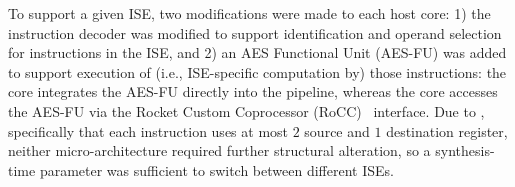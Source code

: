 \noindent
To support a given ISE, two modifications were made to each host core:
1) the instruction decoder was modified to support identification and 
   operand selection for instructions in the ISE,
   and
2) an AES Functional Unit (AES-FU) was added to support execution of
   (i.e., ISE-specific computation by) those instructions:
   the  core integrates the AES-FU directly into the pipeline,
   whereas
   the  core accesses   the AES-FU via the
   Rocket Custom Coprocessor (RoCC)~\cite[Section 4]{rocket:16}
   interface.
Due to , 
specifically that each instruction uses at most $2$ source and $1$ destination register, 
neither micro-architecture required further structural alteration, so
a synthesis-time parameter was sufficient to switch between different 
ISEs.

